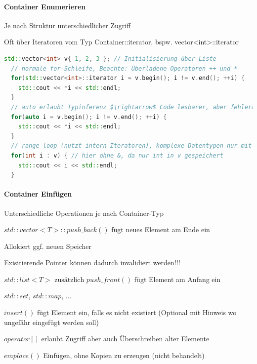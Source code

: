 \documentclass[10pt]{article}
\begin{document}
\paragraph{Container Enumerieren}

\begin{itemize*}
  \item Je nach Struktur unterschiedlicher Zugriff
  \item Oft über Iteratoren vom Typ Container::iterator, bspw. vector<int>::iterator
\end{itemize*}
\begin{lstlisting}[language=C++]
  std::vector<int> v{ 1, 2, 3 }; // Initialisierung über Liste
  // normale for-Schleife, Beachte: Überladene Operatoren ++ und *
  for(std::vector<int>::iterator i = v.begin(); i != v.end(); ++i) {
    std::cout << *i << std::endl;
  }
  // auto erlaubt Typinferenz $\rightarrow$ Code lesbarer, aber fehleranfälliger
  for(auto i = v.begin(); i != v.end(); ++i) {
    std::cout << *i << std::endl;
  }
  // range loop (nutzt intern Iteratoren), komplexe Datentypen nur mit Ref. & sonst werden Kopie erzeugt!
  for(int i : v) { // hier ohne &, da nur int in v gespeichert
    std::cout << i << std::endl;
  }
  \end{lstlisting}

\paragraph{Container Einfügen}

\begin{itemize*}
  \item Unterschiedliche Operationen je nach Container-Typ
  \item $std::vector<T>::push\_back()$ fügt neues Element am Ende ein
  \begin{itemize*}
    \item Allokiert ggf. neuen Speicher
    \item Exisitierende Pointer können dadurch invalidiert werden!!!
  \end{itemize*}
  \item $std::list<T> \text{ zusätzlich } push\_front()$ fügt Element am Anfang ein
  \item $std::set$, $std::map$, ...
  \begin{itemize*}
    \item $insert()$ fügt Element ein, falls es nicht existiert (Optional mit Hinweis wo ungefähr eingefügt werden soll)
    \item $operator[]$ erlaubt Zugriff aber auch Überschreiben alter Elemente
    \item $emplace()$ Einfügen, ohne Kopien zu erzeugen (nicht behandelt)
  \end{itemize*}
\end{itemize*}
\end{document}
